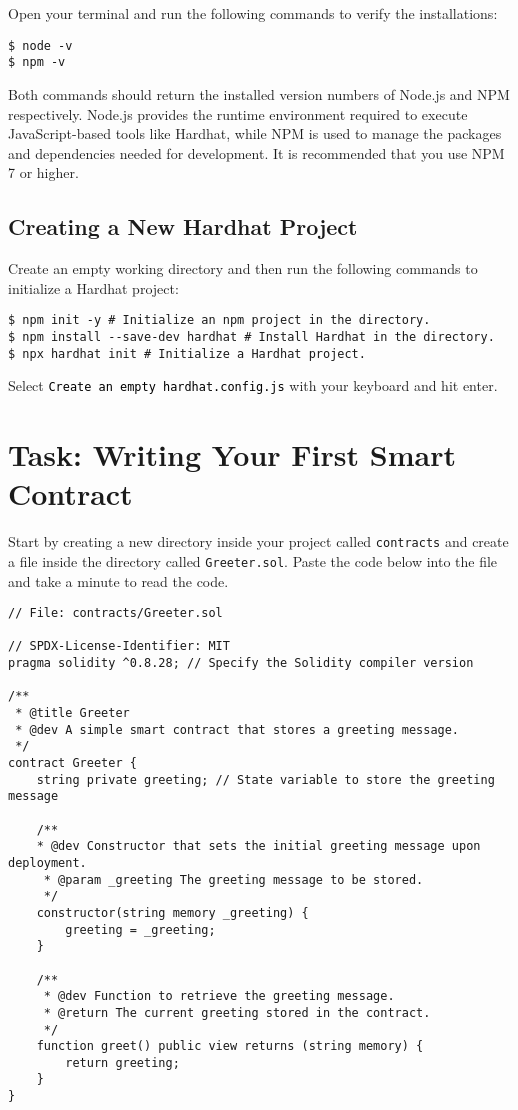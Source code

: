 \documentclass[12pt]{article}
\newcommand{\codegrey}[1]{%
  \texttt{\colorbox{black!4}{\textcolor{black}{#1}}}%
}
\begin{document}
Open your terminal and run the following commands to verify the installations:

\begin{verbatim}
$ node -v
$ npm -v
\end{verbatim}

Both commands should return the installed version numbers of Node.js and NPM respectively. Node.js provides the runtime environment required to execute JavaScript-based tools like Hardhat, while NPM is used to manage the packages and dependencies needed for development. It is recommended that you use NPM 7 or higher.

\subsection{Creating a New Hardhat Project}

Create an empty working directory and then run the following commands to initialize a Hardhat project:

\begin{verbatim}
$ npm init -y # Initialize an npm project in the directory.
$ npm install --save-dev hardhat # Install Hardhat in the directory.
$ npx hardhat init # Initialize a Hardhat project.
\end{verbatim}
Select \codegrey{Create an empty \texttt{hardhat.config.js}} with your keyboard and hit enter.

\section{Task: Writing Your First Smart Contract}

Start by creating a new directory inside your project called \texttt{contracts} and create a file inside the directory called \texttt{Greeter.sol}. Paste the code below into the file and take a minute to read the code.

\begin{lstlisting}[language=Solidity]
// File: contracts/Greeter.sol

// SPDX-License-Identifier: MIT
pragma solidity ^0.8.28; // Specify the Solidity compiler version

/**
 * @title Greeter
 * @dev A simple smart contract that stores a greeting message.
 */
contract Greeter {
    string private greeting; // State variable to store the greeting message

    /**
    * @dev Constructor that sets the initial greeting message upon deployment.
     * @param _greeting The greeting message to be stored.
     */
    constructor(string memory _greeting) {
        greeting = _greeting;
    }

    /**
     * @dev Function to retrieve the greeting message.
     * @return The current greeting stored in the contract.
     */
    function greet() public view returns (string memory) {
        return greeting;
    }
}
\end{lstlisting}
\end{document}
